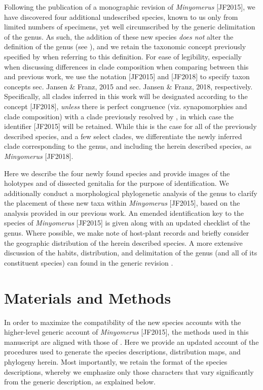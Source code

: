\documentclass[fleqn,10pt,lineno]{wlpeerj} %
\begin{document}
	Following the publication of a monographic revision of \textit{Minyomerus} [JF2015], we have discovered four additional undescribed species, known to us only from limited numbers of specimens, yet well circumscribed by the generic delimitation of the genus.
	As such, the addition of these new species \emph{does not} alter the definition of the genus (see \textbf{}), and we retain the taxonomic concept previously specified by \citet{jansen2015} when referring to this definition.
	For ease of legibility, especially when discussing differences in clade composition when comparing between this and previous work, we use the notation [JF2015] and [JF2018] to specify taxon concepts sec. Jansen \& Franz, 2015 and sec. Jansen \& Franz, 2018, respectively.
	Specifically, all clades inferred in this work will be designated according to the concept [JF2018], \emph{unless} there is perfect congruence (viz. synapomorphies and clade composition) with a clade previously resolved by \citet{jansen2015}, in which case the identifier [JF2015] will be retained.
	While this is the case for all of the previously described species, and a few select clades, we differentiate the newly inferred clade corresponding to the genus, and including the herein described species, as \textit{Minyomerus} [JF2018].
	
	Here we describe the four newly found species and provide images of the holotypes and of dissected genitalia for the purpose of identification.
	We additionally conduct a morphological phylogenetic analysis of the genus to clarify the placement of these new taxa within \textit{Minyomerus} [JF2015], based on the analysis provided in our previous work.
	An emended identification key to the species of \textit{Minyomerus} [JF2015] is given along with an updated checklist of the genus.
	Where possible, we make note of host-plant records and briefly consider the geographic distribution of the herein described species.
	A more extensive discussion of the habits, distribution, and delimitation of the genus (and all of its constituent species) can found in the generic revision \citep{jansen2015}.
	
\section*{Materials and Methods}\label{sec:methods} 
	In order to maximize the compatibility of the new species accounts with the higher-level generic account of \textit{Minyomerus} [JF2015], the methods used in this manuscript are aligned with those of \citet{jansen2015}.
	Here we provide an updated account of the procedures used to generate the species descriptions, distribution maps, and phylogeny herein.
	Most importantly, we retain the format of the species descriptions, whereby we emphasize only those characters that vary significantly from the generic description, as explained below.
\end{document}
